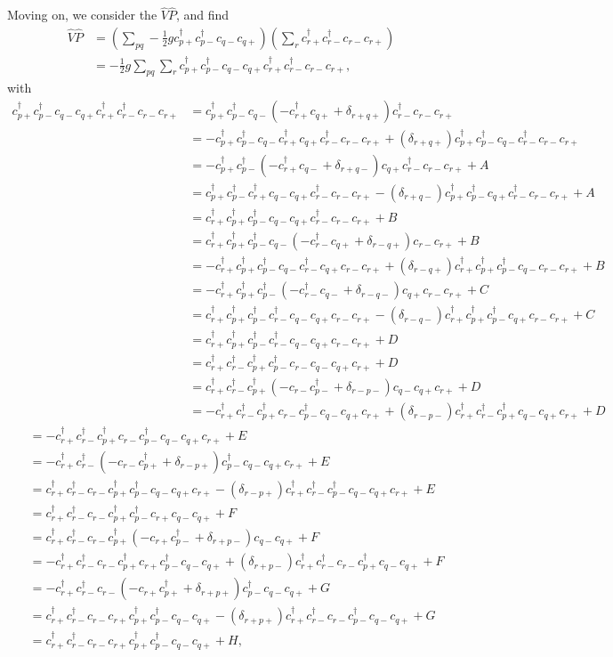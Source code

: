 \documentclass[a4paper]{article}
\newcommand{\nn}{\nonumber}
\newcommand{\cppd}{c_{p+}^\dagger}
\newcommand{\cpmd}{c_{p-}^\dagger}
\newcommand{\cqp}{c_{q+}}
\newcommand{\cqm}{c_{q-}}
\newcommand{\crp}{c_{r+}}
\newcommand{\crpd}{c_{r+}^\dagger}
\newcommand{\crm}{c_{r-}}
\newcommand{\crmd}{c_{r-}^\dagger}
\begin{document}
Moving on, we consider the $\hat V \hat P$, and find
\begin{align}
\hat V \hat P &= \left(  \sum_{pq} -\frac{1}{2}g \cppd \cpmd \cqm \cqp \right) \left( \sum_r \crpd \crmd \crm \crp \right) \nn\\
%
&= -\frac{1}{2}g\sum_{pq}\sum_r \cppd \cpmd \cqm \cqp \crpd \crmd \crm \crp,
\end{align}
with
\begin{align}
\cppd \cpmd \cqm \cqp \crpd \crmd \crm \crp &= \cppd \cpmd \cqm (-\crpd\cqp  + \delta_{r+q+}) \crmd \crm \crp \nn\\
%
&= -\cppd \cpmd \cqm\crpd\cqp \crmd \crm \crp +  (\delta_{r+q+}) \cppd \cpmd \cqm \crmd \crm \crp \nn\\
%
&= -\cppd \cpmd (-\crpd\cqm + \delta_{r+q-})\cqp \crmd \crm \crp + A \nn\\
%
&= \cppd \cpmd \crpd\cqm \cqp \crmd \crm \crp - (\delta_{r+q-})\cppd \cpmd \cqp \crmd \crm \crp + A \nn\\
%
&= \crpd \cppd \cpmd \cqm \cqp \crmd \crm \crp + B \nn\\
%
&= \crpd \cppd \cpmd \cqm (- \crmd\cqp + \delta_{r-q+}) \crm \crp + B \nn\\
%
&= -\crpd \cppd \cpmd \cqm \crmd\cqp \crm \crp + (\delta_{r-q+}) \crpd \cppd \cpmd \cqm \crm \crp   + B \nn\\
%
&= -\crpd \cppd \cpmd (- \crmd\cqm + \delta_{r-q-})\cqp \crm \crp + C \nn\\
%
&= \crpd \cppd \cpmd \crmd\cqm \cqp \crm \crp - (\delta_{r-q-})\crpd \cppd \cpmd \cqp \crm \crp+ C \nn\\
%
&= \crpd \cppd \cpmd \crmd\cqm \cqp \crm \crp + D \nn\\
%
&= \crpd \crmd \cppd \cpmd \crm \cqm \cqp  \crp + D \nn\\
%
&= \crpd \crmd \cppd (- \crm\cpmd + \delta_{r-p-}) \cqm \cqp  \crp + D \nn\\
%
&= -\crpd \crmd \cppd \crm\cpmd  \cqm \cqp  \crp + (\delta_{r-p-}) \crpd \crmd \cppd\cqm \cqp  \crp + D \nn
\end{align}
\begin{align}
&= -\crpd \crmd \cppd \crm\cpmd  \cqm \cqp  \crp + E \nn\\
%
&= -\crpd \crmd (- \crm\cppd + \delta_{r-p+}) \cpmd  \cqm \cqp  \crp + E \nn\\
%
&= \crpd \crmd \crm\cppd \cpmd  \cqm \cqp  \crp - (\delta_{r-p+})\crpd \crmd \cpmd  \cqm \cqp  \crp + E \nn\\
%
&= \crpd \crmd \crm\cppd \cpmd \crp \cqm \cqp   + F \nn\\
%
&= \crpd \crmd \crm\cppd (- \crp\cpmd +\delta_{r+p-}) \cqm \cqp   + F \nn\\
%
&= -\crpd \crmd \crm\cppd \crp\cpmd \cqm \cqp + (\delta_{r+p-})\crpd \crmd \crm\cppd \cqm \cqp    + F \nn\\
%
&= -\crpd \crmd \crm(- \crp\cppd + \delta_{r+p+})\cpmd \cqm \cqp + G \nn\\
%
&= \crpd \crmd \crm \crp\cppd \cpmd \cqm \cqp - (\delta_{r+p+})\crpd \crmd \crm \cpmd \cqm \cqp + G \nn\\
%
&= \crpd \crmd \crm \crp\cppd \cpmd \cqm \cqp + H,
\end{align}
\end{document}
